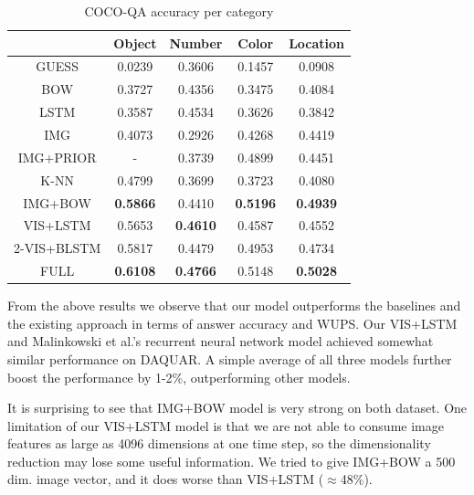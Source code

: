 \documentclass{article} %
\renewcommand{\#}[1]{\textbf{#1}}
\begin{document}
\begin{table}[h]
\caption{COCO-QA accuracy per category}
\label{tab:cocoqa_acc_breakdown}
\begin{center}
\begin{small}
\begin{sc}
\begin{tabular}{c c c c c}
\hline
           &   Object  &   Number &   Color   & Location \\
\hline
GUESS      &   0.0239  &   0.3606 &   0.1457  & 0.0908   \\
BOW        &   0.3727  &   0.4356 &   0.3475  & 0.4084   \\
LSTM       &   0.3587  &   0.4534 &   0.3626  & 0.3842   \\
IMG        &   0.4073  &   0.2926 &   0.4268  & 0.4419   \\
IMG+PRIOR  &   -       &   0.3739 &   0.4899  & 0.4451   \\
K-NN       &   0.4799  &   0.3699 &   0.3723  & 0.4080   \\
IMG+BOW    &\#{0.5866} &   0.4410 &\#{0.5196} &\#{0.4939}\\
VIS+LSTM   &   0.5653  &\#{0.4610}&   0.4587  & 0.4552   \\
2-VIS+BLSTM&   0.5817  &   0.4479 &   0.4953  & 0.4734   \\
FULL       &\#{0.6108} &\#{0.4766}&   0.5148  &\#{0.5028}\\
\hline
\end{tabular}
\end{sc}
\end{small}
\end{center}
\end{table}

From the above results we observe that our model outperforms the baselines and
the existing approach in terms of answer accuracy and WUPS. Our VIS+LSTM and
Malinkowski et al.'s recurrent neural network model \cite{malinowski15} achieved
somewhat similar performance on DAQUAR. A simple average of all three models
further boost the performance by 1-2\%, outperforming other models.

It is surprising to see that IMG+BOW model is very strong on both dataset. One
limitation of our VIS+LSTM model is that we are not able to consume image
features as large as 4096 dimensions at one time step, so the dimensionality
reduction may lose some useful information. We tried to give IMG+BOW a 500 dim.
image vector, and it does worse than VIS+LSTM ($\approx$48\%). 
\end{document}

